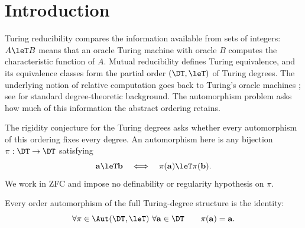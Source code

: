 \begin{abstract}
We prove that every order automorphism of the full partial order of
Turing degrees is the identity, resolving the rigidity conjecture for
the Turing degrees positively.
\end{abstract}
\section{Introduction}\label{sec:introduction}

Turing reducibility compares the information available from sets of
integers: $A\leT B$ means that an oracle Turing machine with oracle $B$
computes the characteristic function of $A$. Mutual reducibility
defines Turing equivalence, and its equivalence classes form the
partial order $(\DT,\leT)$ of Turing degrees. The underlying notion
of relative computation goes back to Turing's oracle machines
\cite[Section~4]{Turing1939}; see \cite{Soare1987} for standard
degree-theoretic background. The automorphism problem asks how much
of this information the abstract ordering retains.

The rigidity conjecture for the Turing degrees asks whether every
automorphism of this ordering fixes every degree.
An automorphism here is any bijection
$\pi:\DT\to\DT$ satisfying
\[
\mathbf a\leT\mathbf b
\quad\Longleftrightarrow\quad
\pi(\mathbf a)\leT\pi(\mathbf b).
\]
We work in ZFC and impose no definability or regularity hypothesis
on $\pi$.

\begin{theorem}\label{thm:rigidity}
Every order automorphism of the full Turing-degree structure is
the identity:
\[
\forall\pi\in\Aut(\DT,\leT)\ \forall\mathbf a\in\DT
\qquad \pi(\mathbf a)=\mathbf a.
\]
\end{theorem}

